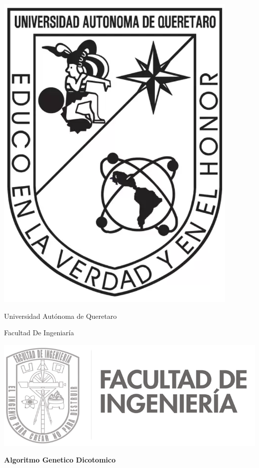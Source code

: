 \begin{titlepage}
    \centering
    
    \begin{minipage}{0.2 \textwidth}
        \centering
        \includegraphics[width=0.5 \textwidth]{rsc/format/uaq.png}
    \end{minipage}
    \hfill
    \begin{minipage}{0.4\textwidth}
        \centering
        {Universidad Autónoma de Queretaro \par}
        \vspace{0.2cm}
        {Facultad De Ingeniaría\par}
    \end{minipage}
    \hfill
    \begin{minipage}{0.3 \textwidth}
        \centering
        \includegraphics[width=1 \textwidth]{rsc/format/fi.png}
    \end{minipage}
    
    \vspace{2cm}
    
    {\LARGE \bfseries Algoritmo Genetico Dicotomico \par}
    

\end{titlepage}
